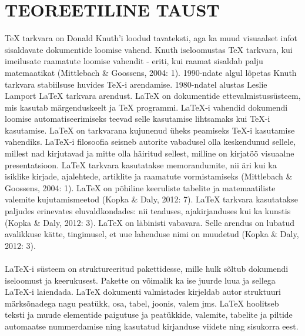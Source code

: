 \documentclass{21kuur}
\begin{document}
\chapter{TEOREETILINE TAUST}
TeX tarkvara on Donald Knuth'i loodud tavateksti, aga ka muud visuaalset infot sisaldavate dokumentide loomise vahend. Knuth iseloomustas TeX tarkvara, kui imeilusate raamatute loomise vahendit - eriti, kui raamat sisaldab palju matemaatikat (Mittlebach \& Goossens, 2004: 1). 1990-ndate algul lõpetas Knuth tarkvara stabiilsuse huvides TeX-i arendamise. 1980-ndatel alustas Leslie Lamport LaTeX tarkvara arendust. LaTeX on dokumentide ettevalmistussüsteem, mis kasutab märgenduskeelt ja TeX programmi. LaTeX-i vahendid dokumendi loomise automatiseerimiseks teevad selle kasutamise lihtsamaks kui TeX-i kasutamise. LaTeX on tarkvarana kujunenud üheks peamiseks TeX-i kasutamise vahendiks. LaTeX-i filosoofia seisneb autorite vabadusel olla keskendunud sellele, millest nad kirjutavad ja mitte olla häiritud sellest, milline on kirjatöö visuaalne presentatsioon. LaTeX tarkvara kasutatakse memorandumite, nii äri kui ka isiklike kirjade, ajalehtede, artiklite ja raamatute vormistamiseks (Mittlebach \& Goossens, 2004: 1). LaTeX on põhiline keeruliste tabelite ja matemaatiliste valemite kujutamismeetod (Kopka \& Daly, 2012: 7). LaTeX tarkvara kasutatakse paljudes erinevates eluvaldkondades: nii teaduses, ajakirjanduses kui ka kunstis (Kopka \& Daly, 2012: 3). LaTeX on läbinisti vabavara. Selle arendus on lubatud avalikkuse kätte, tingimusel, et uue lahenduse nimi on muudetud (Kopka \& Daly, 2012: 3). 
\\\\LaTeX-i süsteem on struktureeritud pakettidesse, mille hulk sõltub dokumendi iseloomust ja keerukusest. Pakette on võimalik ka ise juurde luua ja sellega LaTeX-i laiendada. LaTeX dokumenti valmistades kirjeldab autor struktuuri märksõnadega nagu peatükk, osa, tabel, joonis, valem jms. LaTeX hoolitseb teksti ja muude elementide paigutuse ja peatükkide, valemite, tabelite ja piltide automaatse nummerdamise ning kasutatud kirjanduse viidete ning sisukorra eest.
\end{document}
